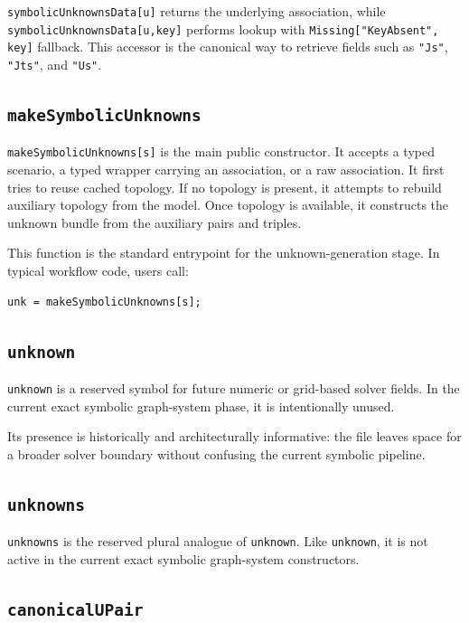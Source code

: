 \documentclass[11pt]{article}
\begin{document}
\texttt{symbolicUnknownsData[u]} returns the underlying association, while \texttt{symbolicUnknownsData[u,key]} performs lookup with \texttt{Missing["KeyAbsent", key]} fallback. This accessor is the canonical way to retrieve fields such as \texttt{"Js"}, \texttt{"Jts"}, and \texttt{"Us"}.

\subsection*{\texttt{makeSymbolicUnknowns}}

\texttt{makeSymbolicUnknowns[s]} is the main public constructor. It accepts a typed scenario, a typed wrapper carrying an association, or a raw association. It first tries to reuse cached topology. If no topology is present, it attempts to rebuild auxiliary topology from the model. Once topology is available, it constructs the unknown bundle from the auxiliary pairs and triples.

This function is the standard entrypoint for the unknown-generation stage. In typical workflow code, users call:

\begin{verbatim}
unk = makeSymbolicUnknowns[s];
\end{verbatim}

\subsection*{\texttt{unknown}}

\texttt{unknown} is a reserved symbol for future numeric or grid-based solver fields. In the current exact symbolic graph-system phase, it is intentionally unused.

Its presence is historically and architecturally informative: the file leaves space for a broader solver boundary without confusing the current symbolic pipeline.

\subsection*{\texttt{unknowns}}

\texttt{unknowns} is the reserved plural analogue of \texttt{unknown}. Like \texttt{unknown}, it is not active in the current exact symbolic graph-system constructors.

\subsection*{\texttt{canonicalUPair}}
\end{document}
